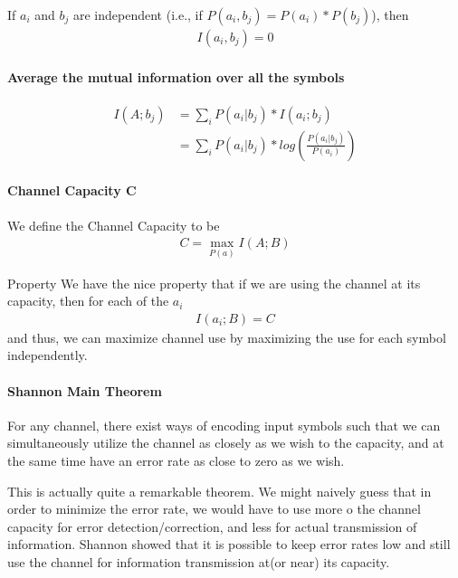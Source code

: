 \documentclass[10 pt,final]{article}
\newcommand{\impo}[1]{{\color{magenta} #1}}
\newcommand{\question}[1]{{\color{blue} #1}}
\begin{document}
If $a_i$ and $b_j$ are independent (i.e., if $P(a_i,b_j) = P(a_i) * P(b_j)$), then 
\begin{align*}
I(a_i, b_j) = 0
\end{align*}

\paragraph{Average the mutual information over all the symbols}
\begin{align*}
I(A; b_j) & = \sum_i P(a_i|b_j)*I(a_i;b_j) \\
& =\sum_i P(a_i |b_j) * log(\frac{P(a_i|b_j)}{P(a_i)})
\end{align*}

\paragraph{Channel Capacity C} We define the Channel Capacity to be 
\begin{align*}
C = \max_{P(a)} I(A;B)
\end{align*}

\question{Property} We have the nice property that if we are using the channel at its capacity, then for each of the $a_i$
\begin{align*}
I(a_i;B) = C
\end{align*}
and thus, \impo{we can maximize channel use by maximizing the use for each symbol independently}.

\paragraph{Shannon Main Theorem} For any channel, there exist ways of \impo{encoding input symbols} such that we can simultaneously utilize the channel as closely as we wish to the capacity, and at the same time have an error rate as close to zero as we wish.

This is actually quite a remarkable theorem. We might naively guess that in order to minimize the error rate, we would have to use more o the channel capacity for error detection/correction, and less for actual transmission of information. \impo{Shannon showed that it is possible to keep error rates low and still use the channel for information transmission at(or near) its capacity}.


\end{document}
